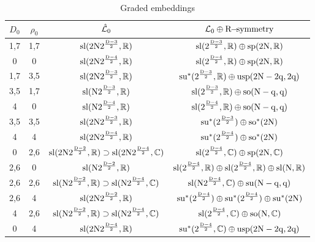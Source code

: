 \documentclass[a4paper,12pt]{article}
\begin{document}
\begin{table}[ht]
\begin{center}
\begin{tabular} {|c |c|c|c|}
\hline$D_0$&$\rho_0$ &$\hat{\mathcal{L}}_0$&$\mathcal{L}_0\oplus
\rm{R\!\!-\!\!symmetry} $\\\hline 1,7&1,7
&$\rm{sl}(2N2^\frac{D-3}{2},\mathbb{R})$&$\rm{sl}(2^\frac{D-3}{2},\mathbb{R})\oplus\rm{sp}(2N,\mathbb{R})$\\
\hline
0&0&$\rm{sl}(2N2^\frac{D-4}{2},\mathbb{R})$&$\rm{sl}(2^\frac{D-4}{2},\mathbb{R})\oplus\rm{sp}(2N,\mathbb{R})$\\\hline
1,7&3,5&$\rm{sl}(2N2^\frac{D-3}{2},\mathbb{R})$&$\rm{su}^*(2^\frac{D-3}{2},\mathbb{R})\oplus\rm{usp}(2N-2q,2q)$\\\hline

3,5&1,7&$\rm{sl}(N2^\frac{D-3}{2},\mathbb{R})$&$\rm{sl}(2^\frac{D-3}{2},\mathbb{R})\oplus\rm{so}(N-q,q)$\\
\hline 4&0&
$\rm{sl}(N2^\frac{D-4}{2},\mathbb{R})$&$\rm{sl}(2^\frac{D-4}{2},\mathbb{R})\oplus\rm{so}(N-q,q)$\\\hline

3,5&3,5&$\rm{sl}(2N2^\frac{D-3}{2},\mathbb{R})$&$\rm{su}^*(2^\frac{D-3}{2})\oplus\rm{so}^*(2N)$\\
\hline
4&4&$\rm{sl}(2N2^\frac{D-4}{2},\mathbb{R})$&$\rm{su}^*(2^\frac{D-4}{2})\oplus\rm{so}^*(2N)$\\\hline

0&2,6&$\rm{sl}(2N2^\frac{D-2}{2},\mathbb{R})\supset\rm{sl}(2N2^\frac{D-4}{2},\mathbb{C})
$&$\rm{sl}(2^\frac{D-4}{2},\mathbb{C})\oplus\rm{sp}(2N,\mathbb{C})$\\\hline

2,6&0&$\rm{sl}(N2^\frac{D-2}{2},\mathbb{R})$&$\rm{sl}(2^\frac{D-4}{2},\mathbb{R})\oplus
\rm{sl}(2^\frac{D-4}{2},\mathbb{R})\oplus\rm{sl}(N,\mathbb{R})$\\\hline

2,6&2,6&$\rm{sl}(N2^\frac{D-2}{2},\mathbb{R})\supset\rm{sl}(N2^\frac{D-4}{2},\mathbb{C})
$&$\rm{sl}(N2^\frac{D-4}{2},\mathbb{C})\oplus\rm{su}(N-q,q)$\\\hline

2,6&4&$\rm{sl}(2N2^\frac{D-2}{2},\mathbb{R})$&$\rm{su}^*(2^\frac{D-4}{2})\oplus
\rm{su}^*(2^\frac{D-4}{2})\oplus\rm{su}^*(2N)$\\\hline

4&2,6&$\rm{sl}(N2^\frac{D-2}{2},\mathbb{R})\supset\rm{sl}(N2^\frac{D-4}{2},\mathbb{C})
$&$\rm{sl}(2^\frac{D-4}{2},\mathbb{C})\oplus\rm{so}(N,\mathbb{C})$\\\hline

0&4&$\rm{sl}(2N2^\frac{D-4}{2},\mathbb{R})$&$\rm{su}^*(2^\frac{D-4}{2},\mathbb{C})\oplus\rm{usp}(2N-2q,2q)$\\\hline

\end{tabular}
\caption{Graded embeddings} \label{embeddings}
\end{center}
\end{table}
\end{document}
